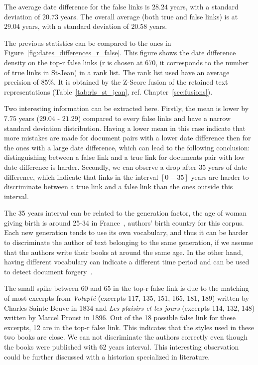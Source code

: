 The average date difference for the false links is $28.24$ years, with a standard deviation of $20.73$ years.
The overall average (both true and false links) is at $29.04$ years, with a standard deviation of $20.58$ years.

The previous statistics can be compared to the ones in Figure~\ref{fig:dates_differences_r_false}.
This figure shows the date difference density on the top-r false links (r is chosen at 670, it corresponds to the number of true links in St-Jean) in a rank list.
The rank list used have an average precision of $85\%$.
It is obtained by the Z-Score fusion of the retained text representations (Table~\ref{tab:rls_st_jean}, ref. Chapter~\ref{sec:fusions}).

Two interesting information can be extracted here.
Firstly, the mean is lower by $7.75$ years ($29.04$ - $21.29$) compared to every false links and have a narrow standard deviation distribution.
Having a lower mean in this case indicate that more mistakes are made for document pairs with a lower date difference then for the ones with a large date difference, which can lead to the following conclusion: distinguishing between a false link and a true link for documents pair with low date difference is harder.
Secondly, we can observe a drop after $35$ years of date difference, which indicate that links in the interval $\left[0-35\right]$ years are harder to discriminate between a true link and a false link than the ones outside this interval.

The 35 years interval can be related to the generation factor, the age of woman giving birth is around 25-34 in France~\cite{generations}, authors' birth country for this corpus.
Each new generation tends to use its own vocabulary, and thus it can be harder to discriminate the author of text belonging to the same generation, if we assume that the authors write their books at around the same age.
In the other hand, having different vocabulary can indicate a different time period and can be used to detect document forgery~\cite{savoy_stylo}.

The small spike between 60 and 65 in the top-r false link is due to the matching of most excerpts from \textit{Volupté} (excerpts 117, 135, 151, 165, 181, 189) written by Charles Sainte-Beuve in 1834 and \textit{Les plaisirs et les jours} (excerpts 114, 132, 148) written by Marcel Proust in 1896.
Out of the 18 possible false link for these excerpts, 12 are in the top-r false link.
This indicates that the styles used in these two books are close.
We can not discriminate the authors correctly even though the books were published with 62 years interval.
This interesting observation could be further discussed with a historian specialized in literature.

